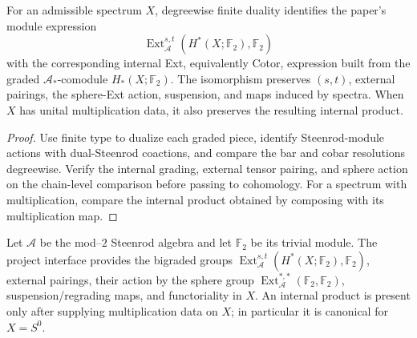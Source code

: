 \begin{proposition}
  \label{prop:adams-module-comodule-ext-comparison}
  \notready
  For an admissible spectrum $X$, degreewise finite duality identifies the
  paper's module expression
  \[
    \operatorname{Ext}_{\mathcal A}^{s,t}
      (H^*(X;\mathbb F_2),\mathbb F_2)
  \]
  with the corresponding internal Ext, equivalently Cotor, expression built
  from the graded $\mathcal A_*$-comodule $H_*(X;\mathbb F_2)$.  The
  isomorphism preserves $(s,t)$, external pairings, the sphere-Ext action,
  suspension, and maps induced by spectra.  When $X$ has unital multiplication
  data, it also preserves the resulting internal product.
\end{proposition}

\begin{proof}
  Use finite type to dualize each graded piece, identify Steenrod-module
  actions with dual-Steenrod coactions, and compare the bar and cobar
  resolutions degreewise.  Verify the internal grading, external tensor
  pairing, and sphere action on the chain-level comparison before passing to
  cohomology.  For a spectrum with multiplication, compare the internal
  product obtained by composing with its multiplication map.
\end{proof}

\begin{definition}
  \label{def:steenrod-ext}
  \notready
  Let $\mathcal A$ be the mod--$2$ Steenrod algebra and let
  $\mathbb F_2$ be its trivial module.  The project interface provides the
  bigraded groups
  $\operatorname{Ext}_{\mathcal A}^{s,t}(H^*(X;\mathbb F_2),\mathbb F_2)$,
  external pairings, their action by the sphere group
  $\operatorname{Ext}_{\mathcal A}^{*,*}(\mathbb F_2,\mathbb F_2)$,
  suspension/regrading maps, and functoriality in $X$.  An internal product is
  present only after supplying multiplication data on $X$; in particular it
  is canonical for $X=S^0$.
\end{definition}

